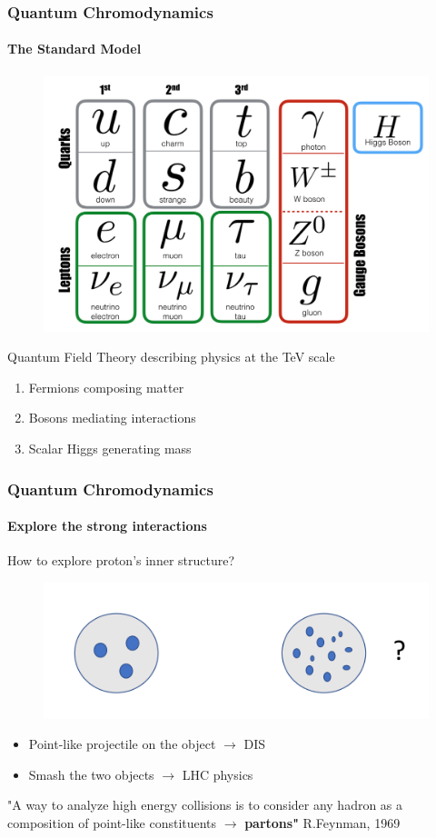 \documentclass[aspectratio=43]{beamer}
\begin{document}
\begin{frame}

	\frametitle{Quantum Chromodynamics}
	\framesubtitle{The Standard Model}

	\begin{figure}
		\includegraphics[width = 6 cm]{SM.png}
	\end{figure}
	
	Quantum Field Theory describing physics at the TeV scale
	\begin{enumerate}
		\item Fermions composing matter
		\item Bosons mediating interactions
		\item Scalar Higgs generating mass
	\end{enumerate}
	
\end{frame}

\begin{frame}

	\frametitle{Quantum Chromodynamics}
	\framesubtitle{Explore the strong interactions}
	
	How to explore proton's inner structure?
	
	\begin{figure}
		\includegraphics[width = 0.5\linewidth]{protons.png}
	\end{figure}
	
	
	\begin{itemize}
		\item Point-like projectile on the object $\longrightarrow$ DIS
		\item Smash the two objects $\longrightarrow$ LHC physics
	\end{itemize}
	
	{\color{blue}"A way to analyze high energy collisions is to consider any hadron as a composition of point-like constituents $\longrightarrow$ \textbf{partons"} } R.Feynman, 1969 

\end{frame}
\end{document}
